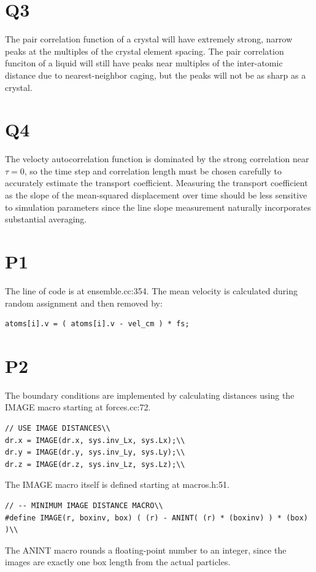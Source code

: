 \documentclass[a4paper,11pt]{article}
\numberwithin{equation}{section}
\begin{document}
\section{Q3}
The pair correlation function of a crystal will have extremely strong, narrow peaks at the multiples of the crystal element spacing.
The pair correlation funciton of a liquid will still have peaks near multiples of the inter-atomic distance due to nearest-neighbor caging, but the peaks will not be as sharp as a crystal.
\section{Q4}
The velocty autocorrelation function is dominated by the strong correlation near $\tau =0$, so the time step and correlation length must be chosen carefully to accurately estimate the transport coefficient.
Measuring the transport coefficient as the slope of the mean-squared displacement over time should be less sensitive to simulation parameters since the line slope measurement naturally incorporates substantial averaging.

\section{P1}
The line of code is at ensemble.cc:354. The mean velocity is calculated during random assignment and then removed by:\\
\begin{lstlisting}
atoms[i].v = ( atoms[i].v - vel_cm ) * fs; 
\end{lstlisting}

\section{P2}
The boundary conditions are implemented by calculating distances using the IMAGE macro starting at forces.cc:72.\\
\begin{lstlisting}
// USE IMAGE DISTANCES\\
dr.x = IMAGE(dr.x, sys.inv_Lx, sys.Lx);\\
dr.y = IMAGE(dr.y, sys.inv_Ly, sys.Ly);\\
dr.z = IMAGE(dr.z, sys.inv_Lz, sys.Lz);\\
\end{lstlisting}
The IMAGE macro itself is defined starting at macros.h:51.\\
\begin{lstlisting}
// -- MINIMUM IMAGE DISTANCE MACRO\\
#define IMAGE(r, boxinv, box) ( (r) - ANINT( (r) * (boxinv) ) * (box) )\\ 
\end{lstlisting}
The ANINT macro rounds a floating-point number to an integer, since the images are exactly one box length from the actual particles.
\end{document}
